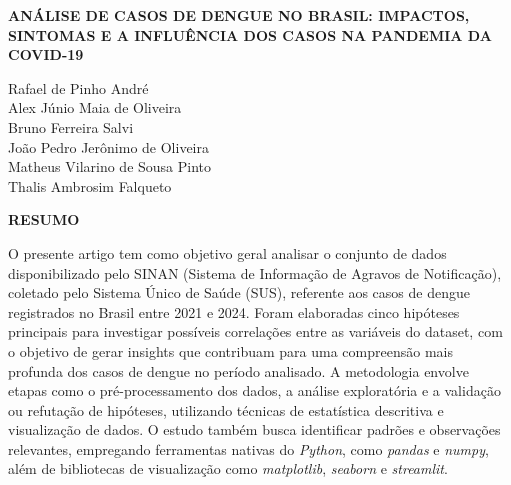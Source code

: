 \documentclass[a4paper, 12pt, twoside]{article}
\newcommand{\titulo}{Análise de casos de Dengue no Brasil: impactos, sintomas e a influência dos casos na Pandemia da COVID-19}
\newcommand{\orientador}{Rafael de Pinho André}
\newcommand{\autor}{Alex Júnio Maia de Oliveira}
\newcommand{\autordois}{Bruno Ferreira  Salvi}
\newcommand{\autortres}{João Pedro Jerônimo de Oliveira}
\newcommand{\autorquatro}{Matheus Vilarino de Sousa Pinto}
\newcommand{\autorcinco}{Thalis Ambrosim Falqueto}
\begin{document}

\singlespacing %
\justifying %


\vspace*{0.5cm} %
\begin{center} %
\textbf{\MakeUppercase{\titulo}}       
\end{center} %


\begin{flushright}
\orientador \\

\autor  \\
\autordois  \\
\autortres  \\
\autorquatro  \\
\autorcinco \\
 
\end{flushright}


\begin{center}
\vspace*{0.5cm}
\textbf{\MakeUppercase{Resumo}}
\end{center}


\noindent 
O presente artigo tem como objetivo geral analisar o conjunto de dados disponibilizado pelo SINAN (Sistema de Informação de Agravos de Notificação), coletado pelo Sistema Único de Saúde (SUS), referente aos casos de dengue registrados no Brasil entre 2021 e 2024. Foram elaboradas cinco hipóteses principais para investigar possíveis correlações entre as variáveis do dataset, com o objetivo de gerar insights que contribuam para uma compreensão mais profunda dos casos de dengue no período analisado. A metodologia envolve etapas como o pré-processamento dos dados, a análise exploratória e a validação ou refutação de hipóteses, utilizando técnicas de estatística descritiva e visualização de dados. O estudo também busca identificar padrões e observações relevantes, empregando ferramentas nativas do \emph{Python}, como \emph{pandas} e \emph{numpy}, além de bibliotecas de visualização como \emph{matplotlib}, \emph{seaborn} e \emph{streamlit}.  
\end{document}
